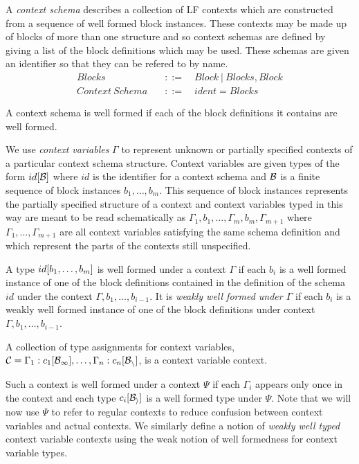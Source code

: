 \documentclass[11pt]{article}
\begin{document}
\begin{definition}
A {\it context schema } describes a collection of LF contexts which
are constructed from a sequence of well formed block instances.
%
These contexts may be made up of blocks of more than one structure and
so context schemas are defined by giving a list of the block
definitions which may be used.
%
These schemas are given an identifier so that they can be refered to
by name.
%
\begin{align*}
Blocks \quad &::=\quad Block\ |\ Blocks,Block\\
Context\ Schema \quad &::=\quad ident = Blocks
\end{align*}

A context schema is well formed if each of the block definitions it
contains are well formed.
\end{definition}

\begin{definition}
We use {\it context variables} $\Gamma$ to represent unknown or
partially specified contexts of a particular context schema structure.
%
Context variables are given types of the form 
$id\lbrack {\cal B}\rbrack$ where $id$ is the identifier for a context
schema and $\cal B$ is a finite sequence of block instances
$b_1,\ldots,b_m$.
%
This sequence of block instances represents the partially specified
structure of a context and context variables typed in this way are
meant to be read schematically as
$\Gamma_1,b_1,\ldots,\Gamma_m,b_m,\Gamma_{m+1}$ where
$\Gamma_1,\ldots,\Gamma_{m+1}$ are all context variables satisfying
the same schema definition and which represent the parts of the
contexts still unspecified.

A type $id\lbrack {b_1,\ldots,b_m}\rbrack$ is well formed under a context
$\Gamma$ if each $b_i$ is a well formed instance of one of the block
definitions contained in the definition of the schema $id$ under the
context $\Gamma,b_1,\ldots,b_{i-1}$.
%
It is {\it weakly well formed under $\Gamma$} if each $b_i$ is a
weakly well formed instance of one of the block definitions under
context $\Gamma,b_1,\ldots,b_{i-1}$.
\end{definition}

\begin{definition}
A collection of type assignments for context variables,
$\mathcal{C}=\Gamma_1:c_1\lbrack {\cal{B_1}}\rbrack,\ldots,\Gamma_n:c_n\lbrack {\cal{B_n}}\rbrack$,
is a context variable context.

Such a context is well formed under a context $\Psi$ if each
$\Gamma_i$ appears only once in the context and each type
$c_i\lbrack {\cal{B_i}}\rbrack$ is a well formed type under $\Psi$.
%
Note that we will now use $\Psi$ to refer to regular contexts to
reduce confusion between context variables and actual contexts.
%
We similarly define a notion of {\it weakly well typed} context
variable contexts using the weak notion of well formedness for context
variable types.
\end{definition}
\end{document}
